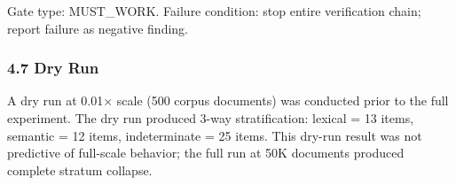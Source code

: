Gate type: MUST_WORK. Failure condition: stop entire verification chain; report failure as negative finding.

\subsubsection{4.7 Dry Run}

A dry run at 0.01× scale (500 corpus documents) was conducted prior to the full experiment. The dry run produced 3-way stratification: lexical = 13 items, semantic = 12 items, indeterminate = 25 items. This dry-run result was not predictive of full-scale behavior; the full run at 50K documents produced complete stratum collapse.

